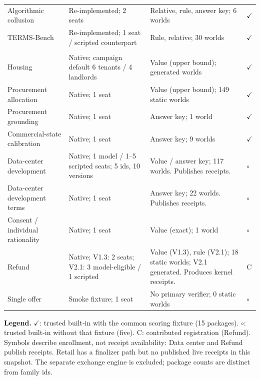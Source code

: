 \begin{longtable}{@{}P{1.44in}P{1.77in}P{2.64in}P{0.55in}@{}}
Algorithmic collusion & Re-implemented; 2 seats & Relative, rule, answer key; 6 worlds & $\checkmark$\\
TERMS-Bench & Re-implemented; 1 seat / scripted counterpart & Rule, relative; 30 worlds & $\checkmark$\\
\addlinespace[5pt]
\\[2pt]
Housing & Native; campaign default 6 tenants / 4 landlords & Value (upper bound); generated worlds & $\checkmark$\\
Procurement allocation & Native; 1 seat & Value (upper bound); 149 static worlds & $\checkmark$\\
Procurement grounding & Native; 1 seat & Answer key; 1 world & $\checkmark$\\
Commercial-state calibration & Native; 1 seat & Answer key; 9 worlds & $\checkmark$\\
Data-center development & Native; 1 model / 1--5 scripted seats; 5 ids, 10 versions & Value / answer key; 117 worlds. Publishes receipts. & $\circ$\\
Data-center development terms & Native; 1 seat & Answer key; 22 worlds. Publishes receipts. & $\circ$\\
Consent / individual rationality & Native; 1 seat & Value (exact); 1 world & $\circ$\\
Refund & Native; V1.3: 2 seats; V2.1: 3 model-eligible / 1 scripted & Value (V1.3), rule (V2.1); 18 static worlds; V2.1 generated. Produces kernel receipts. & C\\
Single offer & Smoke fixture; 1 seat & No primary verifier; 0 static worlds & $\circ$\\
\end{longtable}
\endgroup

{\small\textbf{Legend.} $\checkmark$: trusted built-in with the common
scoring fixture (15 packages). $\circ$: trusted built-in without that
fixture (five). C: contributed registration (Refund). Symbols describe
enrollment, not receipt availability: Data center and Refund publish
receipts. Retail has a finalizer path but no published live receipts in
this snapshot. The separate exchange engine is excluded; package counts
are distinct from family ids.\par}

